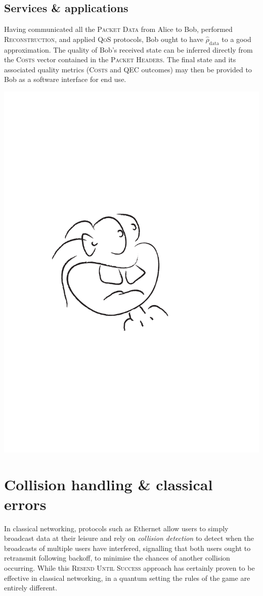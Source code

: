 \documentclass[aps, rmp, twocolumn, amsmath, amssymb, nofootinbib, superscriptaddress, longbibliography, floatfix, table-of-contents, eqsecnum]{revtex4-1}
\begin{document}
%
%

\subsection{Services \& applications} 

Having communicated all the \textsc{Packet Data} from Alice to Bob, performed \textsc{Reconstruction}, and applied \textsc{QoS} protocols, Bob ought to have $\hat\rho_\text{data}$ to a good approximation. The quality of Bob's received state can be inferred directly from the \textsc{Costs} vector contained in the \textsc{Packet Headers}. The final state and its associated quality metrics (\textsc{Costs} and QEC outcomes) may then be provided to Bob as a software interface for end use.

\begin{center}
	\includegraphics[width=0.6\columnwidth]{sketch_12}
\end{center}

%
%

\section{Collision handling \& classical errors} \label{sec:collision}  

In classical networking, protocols such as Ethernet allow users to simply broadcast data at their leisure and rely on \textit{collision detection} to detect when the broadcasts of multiple users have interfered, signalling that both users ought to retransmit following backoff, to minimise the chances of another collision occurring. While this \textsc{Resend Until Success} approach has certainly proven to be effective in classical networking, in a quantum setting the rules of the game are entirely different.
\end{document}
